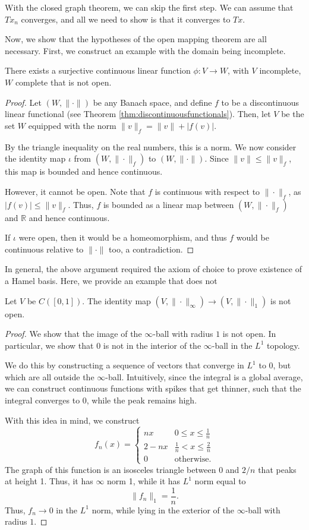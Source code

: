 \documentclass[twoside,symmetric, openany, 12pt]{./tuftebook}
\theoremstyle{definition}
\theoremstyle{definition}
\theoremstyle{definition}
\newcommand{\R}{\mathbb{R}}
\begin{document}
With the closed graph theorem, we can skip the first step. We can assume that $Tx_n$ converges, and all we need to show is that it converges to $Tx$.

Now, we show that the hypotheses of the open mapping theorem are all necessary. First, we construct an example with the domain being incomplete.
\begin{Example}
	There exists a surjective continuous linear function $\phi: V \to W$, with $V$ incomplete, $W$ complete that is not open.
\end{Example}
\begin{proof}
	Let $(W, \|\cdot\|)$ be any Banach space, and define $f$ to be a discontinuous linear functional (see Theorem \ref{thm:discontinuousfunctionals}). Then, let $V$ be the set $W$ equipped with the norm $\|v\|_f = \|v\| + |f(v)|$.
	
	By the triangle inequality on the real numbers, this is a norm. We now consider the identity map $\iota$ from $(W, \|\cdot\|_f)$ to $(W, \|\cdot \|)$. Since $\|v\| \le \|v\|_f$, this map is bounded and hence continuous.
	
	However, it cannot be open. Note that $f$ is continuous with respect to $\|\cdot\|_f$, as $|f(v)|\le \|v\|_f$. Thus, $f$ is bounded as a linear map between $(W, \|\cdot\|_f)$ and $\R$ and hence continuous. 
	
	If $\iota$ were open, then it would be a homeomorphism, and thus $f$ would be continuous relative to $\|\cdot\|$ too, a contradiction.
\end{proof}
In general, the above argument required the axiom of choice to prove existence of a Hamel basis. Here, we provide an example that does not
\begin{Example}
	Let $V$ be $C([0,1])$. The identity map $(V, \|\cdot\|_\infty)\to (V, \|\cdot\|_1)$ is not open. 
\end{Example}
\begin{proof}
	We show that the image of the $\infty$-ball with radius $1$ is not open. In particular, we show that $0$ is not in the interior of the $\infty$-ball in the $L^1$ topology. 
	
	We do this by constructing a sequence of vectors that converge in $L^1$ to $0$, but which are all outside the $\infty$-ball. Intuitively, since the integral is a global average, we can construct continuous functions with spikes that get thinner, such that the integral converges to 0, while the peak remains high. 
	
	With this idea in mind, we construct
	\[f_n(x) = \begin{cases}
		nx & 0 \le x \le \frac 1n\\
		2 - nx & \frac 1n < x \le \frac 2n\\
		0 & \text{otherwise.}
	\end{cases}\]
The graph of this function is an isosceles triangle between $0$ and $2/n$ that peaks at height 1. Thus, it has $\infty$ norm 1, while it has $L^1$ norm equal to
\[\|f_n\|_1 = \frac 1n.\]
Thus, $f_n\to 0$ in the $L^1$ norm, while lying in the exterior of the $\infty$-ball with radius $1$. 
\end{proof}
\end{document}
